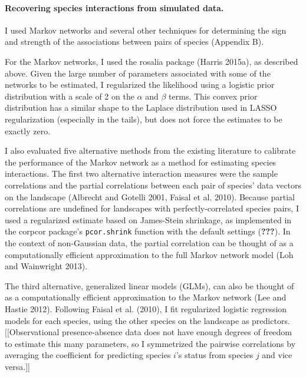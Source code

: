 \documentclass[12pt,]{article}
\begin{document}
\begin{spacing}{1.9}
\begin{flushleft}
\paragraph{Recovering species interactions from simulated
data.}\label{recovering-species-interactions-from-simulated-data.}

I used Markov networks and several other techniques for determining the
sign and strength of the associations between pairs of species (Appendix
B).

For the Markov networks, I used the rosalia package (Harris 2015a), as
described above. Given the large number of parameters associated with
some of the networks to be estimated, I regularized the likelihood using
a logistic prior distribution with a scale of 2 on the \(\alpha\) and
\(\beta\) terms. This convex prior distribution has a similar shape to
the Laplace distribution used in LASSO regularization (especially in the
tails), but does not force the estimates to be exactly zero.

I also evaluated five alternative methods from the existing literature
to calibrate the performance of the Markov network as a method for
estimating species interactions. The first two alternative interaction
measures were the sample correlations and the partial correlations
between each pair of species' data vectors on the landscape (Albrecht
and Gotelli 2001, Faisal et al. 2010). Because partial correlations are
undefined for landscapes with perfectly-correlated species pairs, I used
a regularized estimate based on James-Stein shrinkage, as implemented in
the corpcor package's \texttt{pcor.shrink} function with the default
settings ({\textbf{???}}). In the context of non-Gaussian data, the
partial correlation can be thought of as a computationally efficient
approximation to the full Markov network model (Loh and Wainwright
2013).

The third alternative, generalized linear models (GLMs), can also be
thought of as a computationally efficient approximation to the Markov
network (Lee and Hastie 2012). Following Faisal et al. (2010), I fit
regularized logistic regression models for each species, using the other
species on the landscape as predictors. {[}{[}Observational
presence-absence data does not have enough degrees of freedom to
estimate this many parameters, so I symmetrized the pairwise
correlations by averaging the coefficient for predicting species \(i\)'s
status from species \(j\) and vice versa.{]}{]}


\end{flushleft}
\end{spacing}
\end{document}
